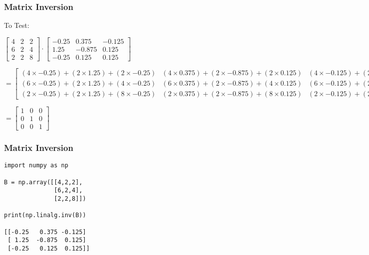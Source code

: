  \begin{frame}[fragile] \frametitle{Matrix Inversion}
To Test:

$\begin{bmatrix}4 & 2 & 2\\6 & 2 & 4\\2 & 2 & 8\end{bmatrix} \cdot \begin{bmatrix}-0.25 & 0.375 & -0.125\\1.25 & -0.875 & 0.125\\-0.25 & 0.125 & 0.125\end{bmatrix}$

$= \begin{bmatrix}(4\times-0.25)+(2\times1.25)+(2\times-0.25) & (4\times0.375)+(2\times-0.875)+(2\times0.125) & (4\times-0.125)+(2\times-0.125)+(2\times0.125)\\(6\times-0.25)+(2\times1.25)+(4\times-0.25) & (6\times0.375)+(2\times-0.875)+(4\times0.125) & (6\times-0.125)+(2\times-0.125)+(4\times0.125)\\(2\times-0.25)+(2\times1.25)+(8\times-0.25) & (2\times0.375)+(2\times-0.875)+(8\times0.125) & (2\times-0.125)+(2\times-0.125)+(8\times0.125)\end{bmatrix}$

$= \begin{bmatrix}1 & 0 & 0\\0 & 1 & 0\\0 & 0 & 1\end{bmatrix}$

 \end{frame}

 \begin{frame}[fragile] \frametitle{Matrix Inversion}

\begin{lstlisting}
import numpy as np

B = np.array([[4,2,2],
              [6,2,4],
              [2,2,8]])

print(np.linalg.inv(B))

[[-0.25   0.375 -0.125]
 [ 1.25  -0.875  0.125]
 [-0.25   0.125  0.125]]
\end{lstlisting}

\end{frame}

